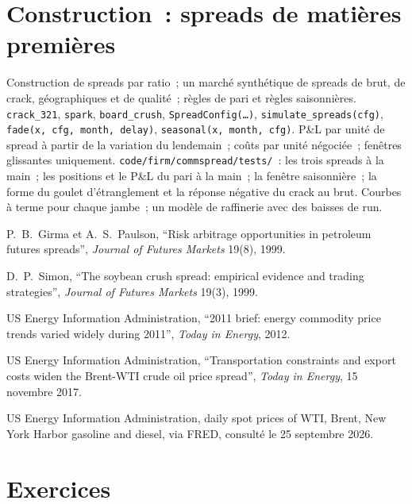 \section{Construction~: spreads de matières premières}\label{bld:s2:commodity-spreads:commspread}

\begin{build}
 Construction de spreads par ratio~; un marché synthétique de spreads de brut, de crack, géographiques et de qualité~; règles de pari et règles saisonnières.
 \texttt{crack\_321}, \texttt{spark}, \texttt{board\_crush}, \texttt{SpreadConfig(\dots)}, \texttt{simulate\_spreads(cfg)},
\texttt{fade(x, cfg, month, delay)}, \texttt{seasonal(x, month, cfg)}.
 P\&L par unité de spread à partir de la variation du lendemain~; coûts par unité négociée~; fenêtres glissantes uniquement.
 \texttt{code/firm/commspread/tests/}~: les trois spreads à la main~; les positions et le P\&L du pari à la main~; la fenêtre saisonnière~;
la forme du goulet d'étranglement et la réponse négative du crack au brut.
 Courbes à terme pour chaque jambe~; un modèle de raffinerie avec des baisses de run.
\end{build}

\begin{omsources}
\item P.~B.~Girma et A.~S.~Paulson, ``Risk arbitrage opportunities in petroleum futures spreads'', \emph{Journal of Futures Markets} 19(8), 1999.
\item D.~P.~Simon, ``The soybean crush spread: empirical evidence and trading strategies'', \emph{Journal of Futures Markets} 19(3), 1999.
\item US Energy Information Administration, ``2011 brief: energy commodity price trends varied widely during 2011'', \emph{Today in Energy}, 2012.
\item US Energy Information Administration, ``Transportation constraints and export costs widen the Brent-WTI crude oil price spread'',
\emph{Today in Energy}, 15 novembre 2017.
\item US Energy Information Administration, daily spot prices of WTI, Brent, New York Harbor gasoline and diesel, via FRED, consulté le 25 septembre
2026.
\end{omsources}

\section{Exercices}

